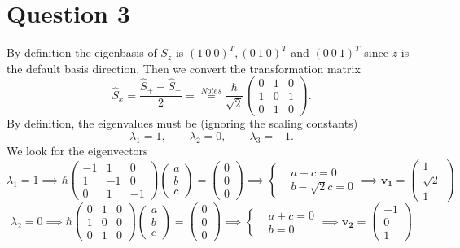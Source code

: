 \documentclass[12pt]{article}
\theoremstyle{definition}
\theoremstyle{definition}
\theoremstyle{definition}
\theoremstyle{definition}
\theoremstyle{definition}
\theoremstyle{example}
\theoremstyle{note}
\theoremstyle{remark}
\theoremstyle{example}
\begin{document}
		\section*{Question 3}
			By definition the eigenbasis of $S_{z}$ is $(1 \ 0  \ 0 )^{T} , (0 \ 1 \ 0 )^{T} $ and $(0 \ 0 \ 1)^{T}$ since $z$ is the default basis direction. Then we convert the transformation matrix 
			$$ \hat{S}_{x} = \frac{\hat{S}_{+} - \hat{S}_{-}}{2} =\overset{Notes}{=}  \frac{\hbar}{\sqrt{2}} \begin{pmatrix}
				 0 & 1 & 0 \\ 1 & 0 & 1\\ 0 & 1 & 0
			\end{pmatrix}.$$
			By definition, the eigenvalues must be (ignoring the scaling constants) $$\lambda_{1} =1, \qquad \lambda_{2} = 0, \qquad \lambda_{3} = -1.$$			
			We look for the eigenvectors
			\begin{equation*}
				\lambda_{1} =1 \implies \hbar\begin{pmatrix}
				-1 & 1 & 0 \\
				1 & -1 & 0 \\
				0 & 1 & -1
				\end{pmatrix}\begin{pmatrix}
				a \\ b \\ c
				\end{pmatrix} = \begin{pmatrix}
				0 \\ 0 \\0 
				\end{pmatrix} \implies \begin{cases}
				&a-c = 0 \\
				&b- \sqrt{2}c = 0
				\end{cases} \implies \boldsymbol{v_{1}} = \begin{pmatrix}
				1 \\ \sqrt{2} \\ 1
				\end{pmatrix}
			\end{equation*}  
			\begin{equation*}
			\lambda_{2} =0 \implies \hbar\begin{pmatrix}
			0 & 1 & 0 \\
			1 & 0 & 0 \\
			0 & 1 & 0
			\end{pmatrix}\begin{pmatrix}
			a \\ b \\ c
			\end{pmatrix} = \begin{pmatrix}
			0 \\ 0 \\0 
			\end{pmatrix} \implies \begin{cases}
			&a+c = 0 \\
			&b= 0
			\end{cases} \implies \boldsymbol{v_{2}} = \begin{pmatrix}
			-1 \\ 0 \\ 1
			\end{pmatrix}
			\end{equation*}  
\end{document}
